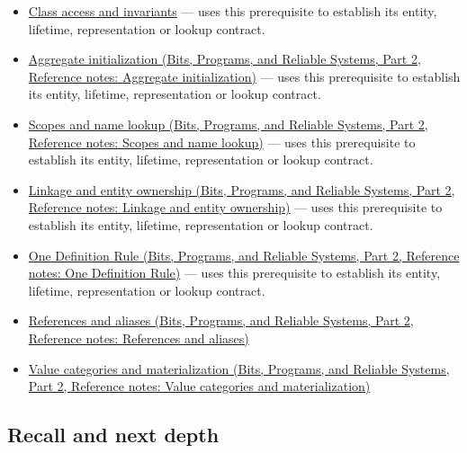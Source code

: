 \hypertarget{appendix-2e4d494c2d94-used-by}{}

\begin{itemize}
\tightlist
\item
  \hyperref[appendix-8e5214819615]{Class access and invariants} --- uses this prerequisite to establish its entity, lifetime, representation or lookup contract.
\item
  \href{../01-Bits-Programs-and-Reliable-Systems-P02/main.pdf\#appendix-b7174c179542}{Aggregate initialization (Bits, Programs, and Reliable Systems, Part 2, Reference notes: Aggregate initialization)} --- uses this prerequisite to establish its entity, lifetime, representation or lookup contract.
\item
  \href{../01-Bits-Programs-and-Reliable-Systems-P02/main.pdf\#appendix-b12b31759da1}{Scopes and name lookup (Bits, Programs, and Reliable Systems, Part 2, Reference notes: Scopes and name lookup)} --- uses this prerequisite to establish its entity, lifetime, representation or lookup contract.
\item
  \href{../01-Bits-Programs-and-Reliable-Systems-P02/main.pdf\#appendix-74a0ec818c18}{Linkage and entity ownership (Bits, Programs, and Reliable Systems, Part 2, Reference notes: Linkage and entity ownership)} --- uses this prerequisite to establish its entity, lifetime, representation or lookup contract.
\item
  \href{../01-Bits-Programs-and-Reliable-Systems-P02/main.pdf\#appendix-49d27bc9d9a5}{One Definition Rule (Bits, Programs, and Reliable Systems, Part 2, Reference notes: One Definition Rule)} --- uses this prerequisite to establish its entity, lifetime, representation or lookup contract.
\item
  \href{../01-Bits-Programs-and-Reliable-Systems-P02/main.pdf\#appendix-d6d562ca9fbb}{References and aliases (Bits, Programs, and Reliable Systems, Part 2, Reference notes: References and aliases)}
\item
  \href{../01-Bits-Programs-and-Reliable-Systems-P02/main.pdf\#appendix-1121b30eaeb0}{Value categories and materialization (Bits, Programs, and Reliable Systems, Part 2, Reference notes: Value categories and materialization)}
\end{itemize}

\subsection{Recall and next depth}\label{appendix-2e4d494c2d94-recall-and-next-depth}

